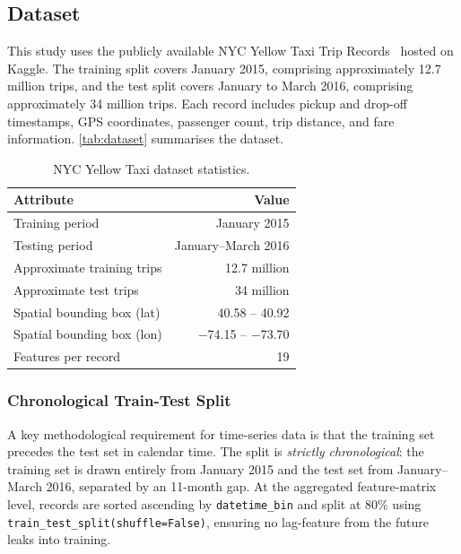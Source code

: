 \documentclass[a4paper,fleqn]{cas-dc}
\begin{document}
\subsection{Dataset}

This study uses the publicly available NYC Yellow Taxi Trip Records~\cite{taxinyc_dataset} hosted on Kaggle.  The training split covers January 2015, comprising approximately 12.7 million trips, and the test split covers January to March 2016, comprising approximately 34 million trips.  Each record includes pickup and drop-off timestamps, GPS coordinates, passenger count, trip distance, and fare information.  \autoref{tab:dataset} summarises the dataset.

\begin{table}[t]
\centering
\caption{NYC Yellow Taxi dataset statistics.\label{tab:dataset}}
\begin{tabularx}{\columnwidth}{>{\raggedright\arraybackslash}X r}
\toprule
\textbf{Attribute} & \textbf{Value} \\
\toprule
Training period & January 2015 \\
Testing period  & January--March 2016 \\
Approximate training trips & 12.7 million \\
Approximate test trips & 34 million \\
Spatial bounding box (lat) & 40.58 -- 40.92 \\
Spatial bounding box (lon) & $-$74.15 -- $-$73.70 \\
Features per record & 19 \\
\bottomrule
\end{tabularx}
\end{table}

\subsubsection{Chronological Train-Test Split}
A key methodological requirement for time-series data is that the training set precedes the test set in calendar time.  The split is \emph{strictly chronological}: the training set is drawn entirely from January 2015 and the test set from January--March 2016, separated by an 11-month gap.  At the aggregated feature-matrix level, records are sorted ascending by \texttt{datetime\_bin} and split at 80\% using \texttt{train\_test\_split(shuffle=False)}, ensuring no lag-feature from the future leaks into training.
\end{document}
